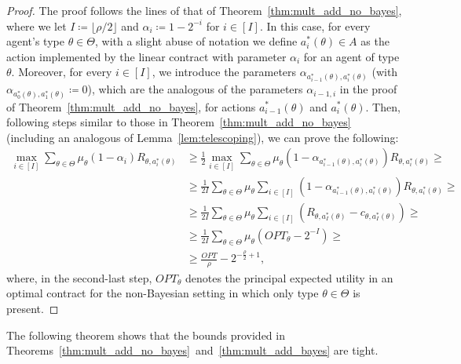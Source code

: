 \begin{proof}
	The proof follows the lines of that of Theorem~\ref{thm:mult_add_no_bayes}, where we let $I \coloneqq \lfloor \rho / 2  \rfloor$ and $\alpha_i \coloneqq 1 - 2 ^{-i}$ for $i \in [I]$.
	In this case, for every agent's type $\theta \in \Theta$, with a slight abuse of notation we define $a_i^\ast(\theta) \in A$ as the action implemented by the linear contract with parameter $\alpha_i$ for an agent of type $\theta$.
	Moreover, for every $i \in [I]$, we introduce the parameters $\alpha_{a_{i-1}^\ast(\theta) , a_i^\ast(\theta) }$ (with $\alpha_{a_{0}^\ast(\theta) , a_1^\ast(\theta) } \coloneqq 0$), which are the analogous of the parameters $\alpha_{i - 1, i}$ in the proof of Theorem~\ref{thm:mult_add_no_bayes}, for actions $a_{i-1}^\ast(\theta)$ and $a_{i}^\ast(\theta)$.
	Then, following steps similar to those in Theorem~\ref{thm:mult_add_no_bayes} (including an analogous of Lemma~\ref{lem:telescoping}), we can prove the following:
	\begin{align*}
		\max_{i \in [I]} \sum_{\theta \in \Theta} \mu_{\theta} \left( 1 - \alpha_i \right) R_{\theta, a_i^\ast(\theta)} & \geq  \frac{1}{2} \max_{i \in [I]} \sum_{\theta \in \Theta} \mu_{\theta} \left( 1 - \alpha_{a_{i-1}^\ast(\theta) , a_i^\ast(\theta) } \right) R_{\theta, a_i^\ast(\theta)} \geq \\
		& \geq  \frac{1}{2 I} \sum_{\theta \in \Theta} \mu_{\theta} \sum_{i \in [I]} \left( 1 - \alpha_{a_{i-1}^\ast(\theta) , a_i^\ast(\theta) } \right) R_{\theta, a_i^\ast(\theta)} \geq \\
		& \geq  \frac{1}{2 I} \sum_{\theta \in \Theta} \mu_{\theta} \sum_{i \in [I]} \left( R_{\theta, a_I^\ast(\theta)}  - c_{\theta,a_I^\ast(\theta) } \right) \geq \\
		& \geq 	\frac{1}{2 I} \sum_{\theta \in \Theta} \mu_{\theta} \left(   OPT_{\theta} - 2^{-I} \right) \geq \\
		& \geq \frac{OPT}{\rho} - 2^{-\frac{\rho}{2}+ 1 },
	\end{align*}
	where, in the second-last step, $OPT_{\theta}$ denotes the principal expected utility in an optimal contract for the non-Bayesian setting in which only type $\theta \in \Theta$ is present.
\end{proof}

The following theorem shows that the bounds provided in Theorems~\ref{thm:mult_add_no_bayes}~and~\ref{thm:mult_add_bayes} are tight.
%

